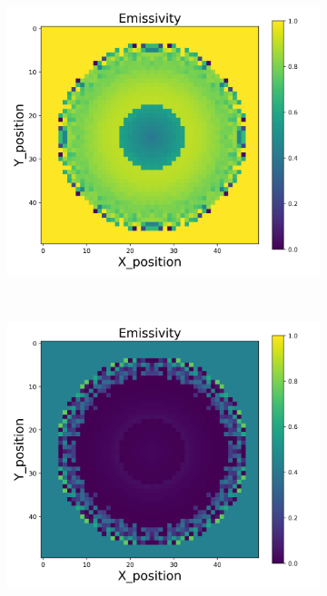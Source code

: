 {\begin{figure}[p]
\begin{minipage}{\textwidth}
\begin{subfigure}{0.325\textwidth}
        \end{subfigure}
        \begin{subfigure}{0.325\textwidth}
            \centering
            \includegraphics[width=\textwidth]{figures/raw_data/31/quad/emi_cal.jpg}
        \end{subfigure}
    \end{minipage}\\
    \begin{minipage}{\textwidth}
        \centering
        \begin{subfigure}{0.325\textwidth}
            \centering
            \includegraphics[width=\textwidth]{figures/raw_data/32/quad/emi_cal.jpg}

\end{subfigure}
\end{minipage}
\end{figure}}
